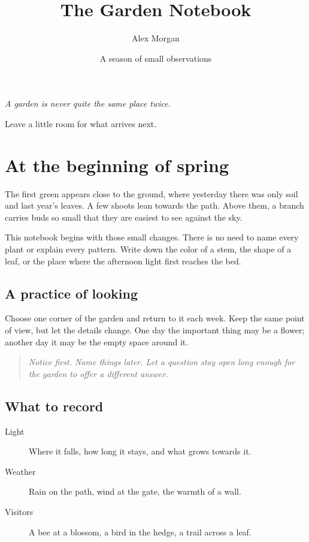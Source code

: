 \documentclass[11pt,a4paper,twoside]{article}
\title{The Garden Notebook}
\author{Alex Morgan}
\date{A season of small observations}
\begin{document}
\begin{floratitle}
\maketitle
\thispagestyle{empty}
\end{floratitle}
\vspace{45mm}
\begin{center}
\begin{minipage}{0.68\textwidth}
\centering\itshape
A garden is never quite the same place twice.\par
Leave a little room for what arrives next.
\end{minipage}
\end{center}
\clearpage
\restoregeometry

\section*{At the beginning of spring}
The first green appears close to the ground, where yesterday there was only
soil and last year's leaves. A few shoots lean towards the path. Above them,
a branch carries buds so small that they are easiest to see against the sky.

This notebook begins with those small changes. There is no need to name
every plant or explain every pattern. Write down the color of a stem, the
shape of a leaf, or the place where the afternoon light first reaches the bed.

\subsection*{A practice of looking}
Choose one corner of the garden and return to it each week. Keep the same
point of view, but let the details change. One day the important thing may
be a flower; another day it may be the empty space around it.

\begin{quote}
\itshape Notice first. Name things later. Let a question stay open long
enough for the garden to offer a different answer.
\end{quote}

\vspace{28mm}
\subsection*{What to record}
\begin{description}
\item[Light] Where it falls, how long it stays, and what grows towards it.
\item[Weather] Rain on the path, wind at the gate, the warmth of a wall.
\item[Visitors] A bee at a blossom, a bird in the hedge, a trail across a leaf.
\end{description}
\clearpage
\end{document}
